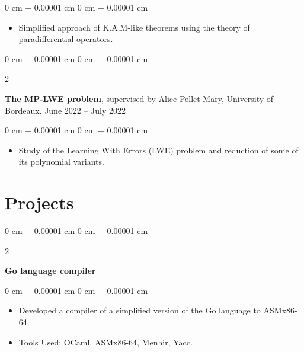 \documentclass[10pt, letterpaper]{article}
\newenvironment{highlights}{
    \begin{itemize}[
        topsep=0.10 cm,
        parsep=0.10 cm,
        partopsep=0pt,
        itemsep=0pt,
        leftmargin=0 cm + 10pt
    ]
}{
    \end{itemize}
} %
\newenvironment{onecolentry}{
    \begin{adjustwidth}{
        0 cm + 0.00001 cm
    }{
        0 cm + 0.00001 cm
    }
}{
    \end{adjustwidth}
} %
\newenvironment{twocolentry}[2][]{
    \onecolentry
    \def\secondColumn{#2}
    \setcolumnwidth{\fill, 4.5 cm}
    \begin{paracol}{2}
}{
    \switchcolumn \raggedleft \secondColumn
    \end{paracol}
    \endonecolentry
} %
\begin{document}
        \vspace{0.10 cm}
        \begin{onecolentry}
            \begin{highlights}
                \item Simplified approach of K.A.M-like theorems using the theory of paradifferential operators.
            \end{highlights}
        \end{onecolentry}
        

        \vspace{0.2 cm}
        
        
        \begin{twocolentry}{
            June 2022 – July 2022
        }
            \textbf{The MP-LWE problem}, supervised by Alice Pellet-Mary, University of Bordeaux. \end{twocolentry}

        \vspace{0.10 cm}
        \begin{onecolentry}
            \begin{highlights}
                \item Study of the Learning With Errors (LWE) problem and reduction of some of its polynomial variants.
            \end{highlights}
        \end{onecolentry}

        
    \section{Projects}

        
        \begin{twocolentry}{
        }
            \textbf{Go language compiler}\end{twocolentry}

        \vspace{0.10 cm}
        \begin{onecolentry}
            \begin{highlights}
                \item Developed a compiler of a simplified version of the Go language to ASMx86-64.
                \item Tools Used: OCaml, ASMx86-64, Menhir, Yacc.
            \end{highlights}
        \end{onecolentry}
\end{document}
